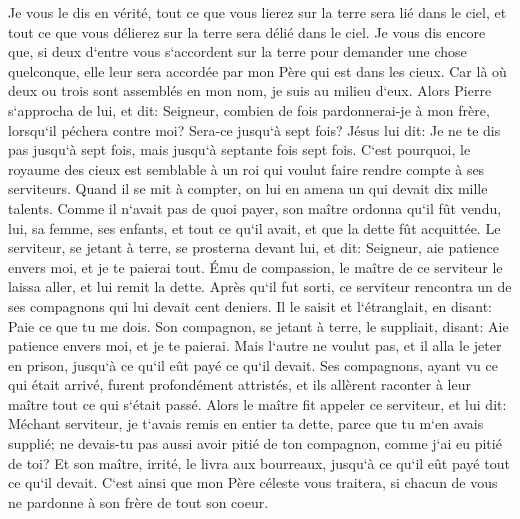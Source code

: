 \verse Je vous le dis en vérité, tout ce que vous lierez sur la terre sera lié dans le ciel, et tout ce que vous délierez sur la terre sera délié dans le ciel. 
\verse Je vous dis encore que, si deux d`entre vous s`accordent sur la terre pour demander une chose quelconque, elle leur sera accordée par mon Père qui est dans les cieux. 
\verse Car là où deux ou trois sont assemblés en mon nom, je suis au milieu d`eux. 
\verse Alors Pierre s`approcha de lui, et dit: Seigneur, combien de fois pardonnerai-je à mon frère, lorsqu`il péchera contre moi? Sera-ce jusqu`à sept fois? 
\verse Jésus lui dit: Je ne te dis pas jusqu`à sept fois, mais jusqu`à septante fois sept fois. 
\verse C`est pourquoi, le royaume des cieux est semblable à un roi qui voulut faire rendre compte à ses serviteurs. 
\verse Quand il se mit à compter, on lui en amena un qui devait dix mille talents. 
\verse Comme il n`avait pas de quoi payer, son maître ordonna qu`il fût vendu, lui, sa femme, ses enfants, et tout ce qu`il avait, et que la dette fût acquittée. 
\verse Le serviteur, se jetant à terre, se prosterna devant lui, et dit: Seigneur, aie patience envers moi, et je te paierai tout. 
\verse Ému de compassion, le maître de ce serviteur le laissa aller, et lui remit la dette. 
\verse Après qu`il fut sorti, ce serviteur rencontra un de ses compagnons qui lui devait cent deniers. Il le saisit et l`étranglait, en disant: Paie ce que tu me dois. 
\verse Son compagnon, se jetant à terre, le suppliait, disant: Aie patience envers moi, et je te paierai. 
\verse Mais l`autre ne voulut pas, et il alla le jeter en prison, jusqu`à ce qu`il eût payé ce qu`il devait. 
\verse Ses compagnons, ayant vu ce qui était arrivé, furent profondément attristés, et ils allèrent raconter à leur maître tout ce qui s`était passé. 
\verse Alors le maître fit appeler ce serviteur, et lui dit: Méchant serviteur, je t`avais remis en entier ta dette, parce que tu m`en avais supplié; 
\verse ne devais-tu pas aussi avoir pitié de ton compagnon, comme j`ai eu pitié de toi? 
\verse Et son maître, irrité, le livra aux bourreaux, jusqu`à ce qu`il eût payé tout ce qu`il devait. 
\verse C`est ainsi que mon Père céleste vous traitera, si chacun de vous ne pardonne à son frère de tout son coeur. 

